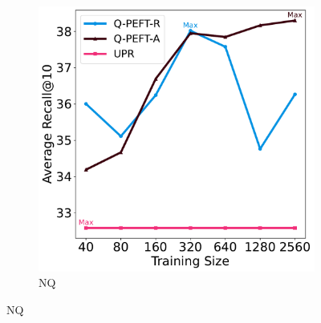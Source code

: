 \documentclass[sigconf,natbib=true,anonymous=false]{acmart}
\begin{document}
\begin{figure}[htbp]
    \centering
    \begin{minipage}{0.23\textwidth}
        \begin{subfigure}[b]{\textwidth}
            \includegraphics[width=\textwidth]{Figures/r_retriever_k_multi_avg_nq.pdf}
            \caption{NQ}
            \label{fig:nq}
        \end{subfigure}
        

\end{minipage}
\end{figure}
\end{document}
